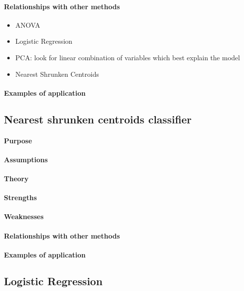 \paragraph{Relationships with other methods}
\begin{itemize}
    \item ANOVA
    \item Logistic Regression
    \item PCA: look for linear combination of variables which best explain the model
    \item Nearest Shrunken Centroids
\end{itemize}

\paragraph{Examples of application}



\subsection{Nearest shrunken centroids classifier}
\paragraph{Purpose}
\paragraph{Assumptions}
\paragraph{Theory}
\paragraph{Strengths}
\paragraph{Weaknesses}
\paragraph{Relationships with other methods}
\paragraph{Examples of application}


\subsection{Logistic Regression}
